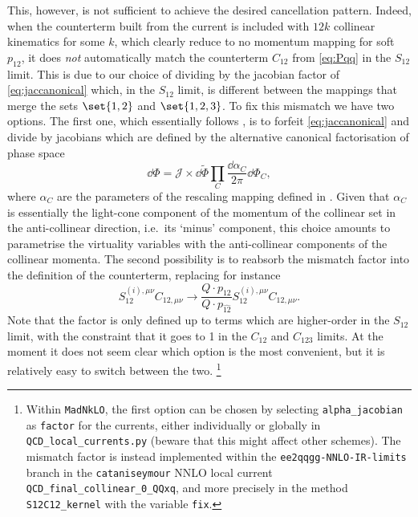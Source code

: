 \documentclass[11pt,a4paper]{article}
\newcommand{\mgd}[1]{\widehat{#1}}
\begin{document}
This, however, is not sufficient to achieve
the desired cancellation pattern.
Indeed, when the counterterm built from the current 
is included with $12k$ collinear kinematics for some $k$,
which clearly reduce to no momentum mapping for soft $p_{12}$,
it does \emph{not} automatically match
the counterterm $C_{12}$ from \cref{eq:Pqq} in the $S_{12}$ limit.
This is due to our choice of dividing by the jacobian factor
of \cref{eq:jaccanonical} which, in the $S_{12}$ limit,
is different between the mappings that merge
the sets $\set{1,2}$ and $\set{1,2,3}$.
To fix this mismatch we have two options.
The first one, which essentially follows \cite{Somogyi:2006da},
is to forfeit \cref{eq:jaccanonical} and divide by jacobians
which are defined by the alternative
canonical factorisation of phase space
\begin{equation}
	\dd{\Phi} = \mathcal{J}\times \dd{\tilde{\Phi}}
	\prod_{C} \frac{\dd{\alpha_C}}{2\pi} \dd{\Phi_C},
\end{equation}
where $\alpha_C$ are the parameters of the rescaling mapping
defined in \cite{Somogyi:2006da}.
Given that $\alpha_C$ is essentially the light-cone component
of the momentum of the collinear set in the anti-collinear direction,
i.e.\ its `minus' component,
this choice amounts to parametrise the virtuality variables
with the anti-collinear components of the collinear momenta.
The second possibility is to reabsorb the mismatch factor
into the definition of the counterterm, replacing for instance
\begin{equation}
	S_{12}^{(i),\mu\nu} C_{12,\mu\nu}
	\to \frac{Q\cdot p_{12}}{Q\cdot p_{\mgd{12}}}
	S_{12}^{(i),\mu\nu} C_{12,\mu\nu}.
\end{equation}
Note that the factor is only defined up to terms
which are higher-order in the $S_{12}$ limit,
with the constraint that it goes to 1
in the $C_{12}$ and $C_{123}$ limits.
At the moment it does not seem clear which option
is the most convenient, but it is relatively easy
to switch between the two.%
\footnote{
Within \texttt{MadNkLO}, the first option can be chosen
by selecting \texttt{alpha\_jacobian} as \texttt{factor}
for the currents, either individually
or globally in \texttt{QCD\_local\_currents.py}
(beware that this might affect other schemes).
The mismatch factor is instead implemented
within the \texttt{ee2qqgg-NNLO-IR-limits} branch
in the \texttt{cataniseymour} NNLO local current
\texttt{QCD\_final\_collinear\_0\_QQxq},
and more precisely in the method \texttt{S12C12\_kernel}
with the variable \texttt{fix}.
}
\end{document}
